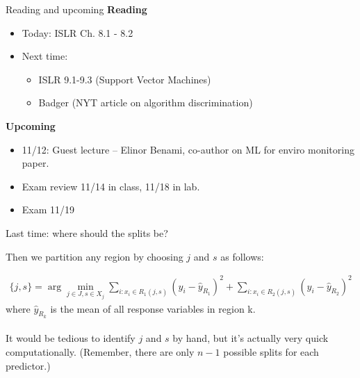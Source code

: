 \documentclass[mathserif, aspectratio=169]{beamer}
\begin{document}
\begin{frame}{Reading and upcoming}
\textbf{Reading}
\begin{itemize}
\item Today: ISLR Ch. 8.1 - 8.2
\item Next time: 
\begin{itemize}
	\item ISLR 9.1-9.3 (Support Vector Machines)
	\item Badger (NYT article on algorithm discrimination)
\end{itemize}
\end{itemize}

\textbf{Upcoming}
\begin{itemize}
\item 11/12: Guest lecture -- Elinor Benami, co-author on ML for enviro monitoring paper.
\item Exam review 11/14 in class, 11/18 in lab.
\item Exam 11/19
\end{itemize}

\end{frame}



\begin{frame}{Last time: where should the splits be?}

Then we partition any region by choosing $j$ and $s$ as follows:

\begin{align*}
\{j,s\} = \arg \min_{j\in J, s\in X_j} \sum_{i:x_i\in R_1(j,s)} (y_i-\hat{y}_{R_1})^2 + \sum_{i:x_i\in R_2(j,s)} (y_i-\hat{y}_{R_2})^2
\end{align*}
where $\hat{y}_{R_k}$ is the mean of all response variables in region k.  \\~\\

It would be tedious to identify $j$ and $s$ by hand, but it's actually very quick computationally.  (Remember, there are only $n-1$ possible splits for each predictor.)
\end{frame}
\end{document}
